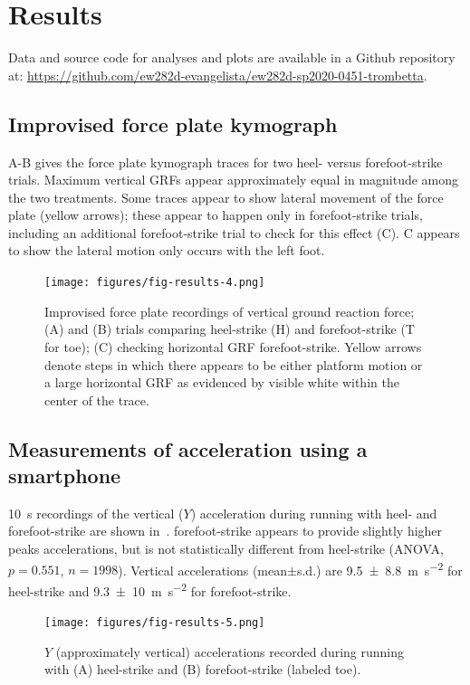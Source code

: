\section{Results}
\label{sec:results}

Data and source code for analyses and plots are available in a Github repository at: \url{https://github.com/ew282d-evangelista/ew282d-sp2020-0451-trombetta}.

\subsection{Improvised force plate kymograph}
A-B gives the force plate kymograph traces for two heel- versus forefoot-strike trials. Maximum vertical GRFs appear approximately equal in magnitude among the two treatments.  Some traces appear to show lateral movement of the force plate (yellow arrows); these appear to happen only in forefoot-strike trials, including an additional forefoot-strike trial to check for this effect (C). C appears to show the lateral motion only occurs with the left foot. 
\begin{figure}
\begin{center}
\texttt{[image: figures/fig-results-4.png]}
\end{center}
\caption{Improvised force plate recordings of vertical ground reaction force; (A) and (B) trials comparing heel-strike (H) and forefoot-strike (T for toe); (C) checking horizontal GRF forefoot-strike. Yellow arrows denote steps in which there appears to be either platform motion or a large horizontal GRF as evidenced by visible white within the center of the trace.}
\label{fig:results:forceplate}
\end{figure}





\subsection{Measurements of acceleration using a smartphone}
\SI{10}{\second} recordings of the vertical ($Y$) acceleration during running with heel- and forefoot-strike are shown in~. forefoot-strike appears to provide slightly higher peaks accelerations, but is not statistically different from heel-strike (ANOVA, $p=0.551$, $n=1998$). Vertical accelerations (mean$\pm$s.d.) are \SI{9.5\pm8.8}{\meter\per\second\squared} for heel-strike and \SI{9.3\pm10}{\meter\per\second\squared} for forefoot-strike. 
\begin{figure}[h]
\begin{center}
\texttt{[image: figures/fig-results-5.png]}
\end{center}
\caption{$Y$ (approximately vertical) accelerations recorded during running with (A) heel-strike and (B) forefoot-strike (labeled toe).}
\label{fig:results:accel}
\end{figure}





